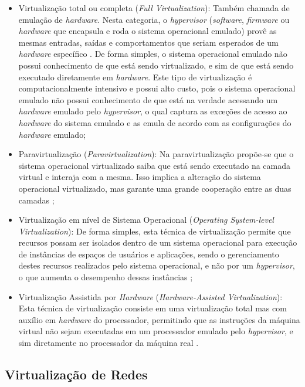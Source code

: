 \begin{itemize}
    \item Virtualização total ou completa (\textit{Full Virtualization}): Também chamada de emulação de \textit{hardware}. Nesta categoria, o \textit{hypervisor} (\textit{software}, \textit{firmware} ou \textit{hardware} que encapsula e roda o sistema operacional emulado) provê as mesmas entradas, saídas e comportamentos que seriam esperados de um \textit{hardware} específico \cite{pearce}. De forma simples, o sistema operacional emulado não possui conhecimento de que está sendo virtualizado, e sim de que está sendo executado diretamente em \textit{hardware}. Este tipo de virtualização é computacionalmente intensivo e possui alto custo, pois o sistema operacional emulado não possui conhecimento de que está na verdade acessando um \textit{hardware} emulado pelo \textit{hypervisor}, o qual captura as exceções de acesso ao \textit{hardware} do sistema emulado e as emula de acordo com as configurações do \textit{hardware} emulado;
    \item Paravirtualização (\textit{Paravirtualization}): Na paravirtualização propõe-se que o sistema operacional virtualizado saiba que está sendo executado na camada virtual e interaja com a mesma. Isso implica a alteração do sistema operacional virtualizado, mas garante uma grande cooperação entre as duas camadas \cite{grosmann};
    \item Virtualização em nível de Sistema Operacional (\textit{Operating System-level Virtualization}): De forma simples, esta técnica de virtualização permite que recursos possam ser isolados dentro de um sistema operacional para execução de instâncias de espaços de usuários e aplicações, sendo o gerenciamento destes recursos realizados pelo sistema operacional, e não por um \textit{hypervisor}, o que aumenta o desempenho dessas instâncias \cite{walters};
    \item Virtualização Assistida por \textit{Hardware} (\textit{Hardware-Assisted Virtualization}): Esta técnica de virtualização consiste em uma virtualização total mas com auxílio em \textit{hardware} do processador, permitindo que as instruções da máquina virtual não sejam executadas em um processador emulado pelo \textit{hypervisor}, e sim diretamente no processador da máquina real \cite{walters}.
\end{itemize}

\subsection{Virtualização de Redes}

